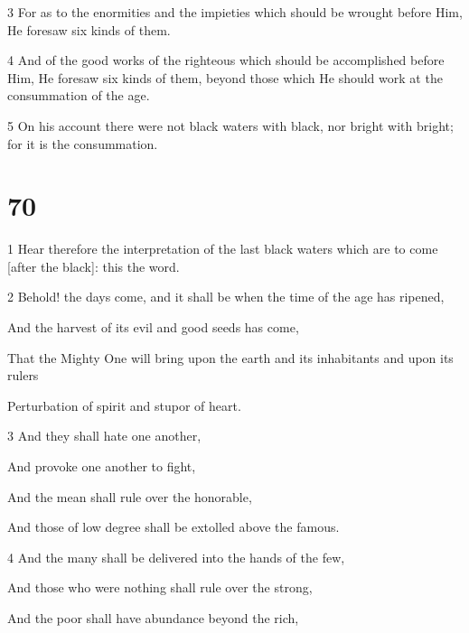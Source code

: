 \par 3 For as to the enormities and the impieties which should be wrought before Him, He foresaw six kinds of them. 

\par 4 And of the good works of the righteous which should be accomplished before Him, He foresaw six kinds of them, beyond those which He should work at the consummation of the age. 

\par 5 On his account there were not black waters with black, nor bright with bright; for it is the consummation.

\chapter{70}

\par 1 Hear therefore the interpretation of the last black waters which are to come [after the black]: this the word. 

\par 2 Behold! the days come, and it shall be when the time of the age has ripened,

\par And the harvest of its evil and good seeds has come,

\par That the Mighty One will bring upon the earth and its inhabitants and upon its rulers

\par Perturbation of spirit and stupor of heart.

\par 3 And they shall hate one another,

\par And provoke one another to fight,

\par And the mean shall rule over the honorable,

\par And those of low degree shall be extolled above the famous.

\par 4 And the many shall be delivered into the hands of the few,

\par And those who were nothing shall rule over the strong,

\par And the poor shall have abundance beyond the rich,


